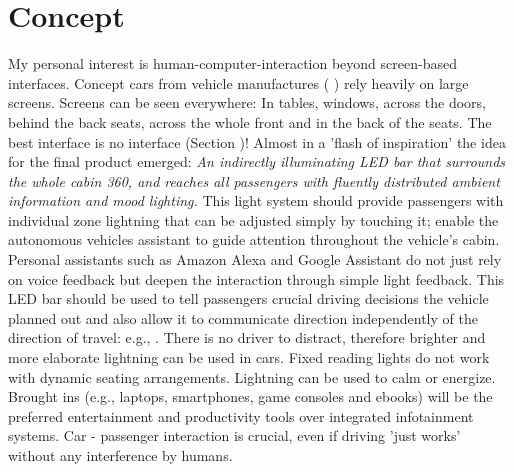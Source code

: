 \section{Concept}
\label{sec:concept}
My personal interest is human-computer-interaction beyond screen-based interfaces. Concept cars from vehicle manufactures ( ) rely heavily on large screens. Screens can be seen everywhere: In tables, windows, across the doors, behind the back seats, across the whole front and in the back of the seats. The best interface is no interface (Section )! 
Almost in a 'flash of inspiration' the idea for the final product emerged: \emph{An indirectly illuminating LED bar that surrounds the whole cabin 360, and reaches all passengers with fluently distributed ambient information and mood lighting.} This light system should provide passengers with individual zone lightning that can be adjusted simply by touching it; enable the autonomous vehicles assistant to guide attention throughout the vehicle's cabin. Personal assistants such as Amazon Alexa and Google Assistant do not just rely on voice feedback but deepen the interaction through simple light feedback. This LED bar should be used to tell passengers crucial driving decisions the vehicle planned out and also allow it to communicate direction independently of the direction of travel: e.g., .
There is no driver to distract, therefore brighter and more elaborate lightning can be used in cars. Fixed reading lights do not work with dynamic seating arrangements. Lightning can be used to calm or energize. Brought ins (e.g., laptops, smartphones, game consoles and ebooks) will be the preferred entertainment and productivity tools over integrated infotainment systems. Car - passenger interaction is crucial, even if driving 'just works' without any interference by humans. 


